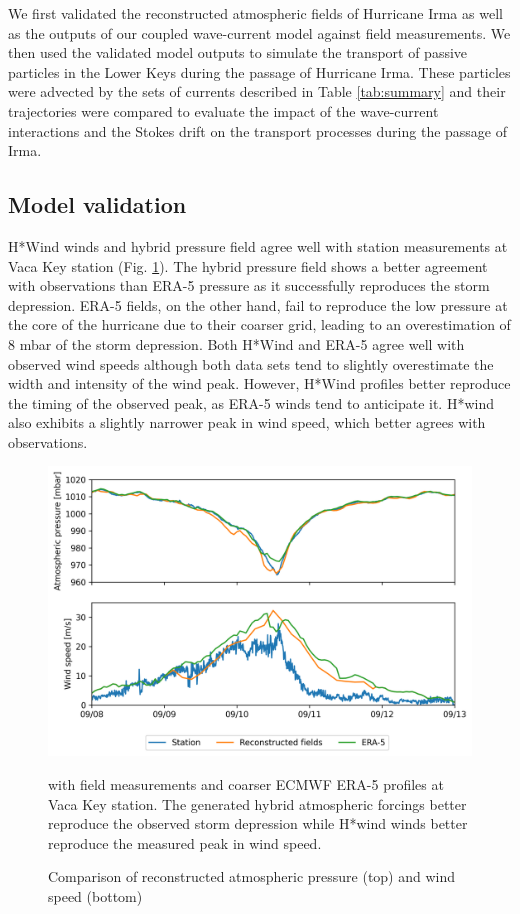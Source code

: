 We first validated the reconstructed atmospheric fields of Hurricane Irma as well as the outputs of our coupled wave-current model against field measurements. We then used the validated model outputs to simulate the transport of passive particles in the Lower Keys during the passage of Hurricane Irma. These particles were advected by the sets of currents described in Table \ref{tab:summary} and their trajectories were compared to evaluate the impact of the wave-current interactions and the Stokes drift on the transport processes during the passage of Irma.

\subsection{Model validation}

H*Wind winds and hybrid pressure field agree well with station measurements at Vaca Key station (Fig. \ref{fig:forcings}). The hybrid pressure field shows a better agreement with observations than ERA-5 pressure as it successfully reproduces the storm depression. ERA-5 fields, on the other hand, fail to reproduce the low pressure at the core of the hurricane due to their coarser grid, leading to an overestimation of 8 mbar of the storm depression. Both H*Wind and ERA-5 agree well with observed wind speeds although both data sets tend to slightly overestimate the width and intensity of the wind peak. However, H*Wind profiles better reproduce the timing of the observed peak, as ERA-5 winds tend to anticipate it. H*wind also exhibits a slightly narrower peak in wind speed, which better agrees with observations.

\begin{figure}
    \centering
    \includegraphics[width=.95\textwidth]{chapters/irma/figures/validation_met_2.png}
    \caption{Comparison of reconstructed atmospheric pressure (top) and wind speed (bottom)} with field measurements and coarser ECMWF ERA-5 profiles at Vaca Key station. The generated hybrid atmospheric forcings better reproduce the observed storm depression while H*wind winds better reproduce the measured peak in wind speed.
    \label{fig:forcings}
\end{figure}

